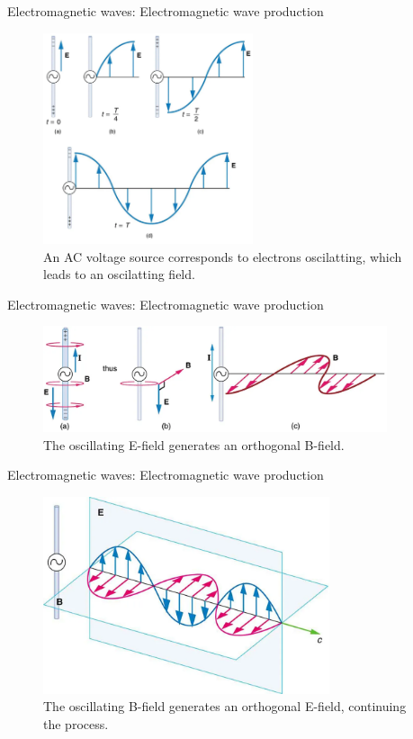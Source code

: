 \documentclass{beamer}
\begin{document}
\begin{frame}{Electromagnetic waves: Electromagnetic wave production}
\begin{figure}
\centering
\includegraphics[width=0.55\textwidth]{figures/gen1.png}
\caption{\label{fig:gen1} An AC voltage source corresponds to electrons oscilatting, which leads to an oscilatting field.}
\end{figure}
\end{frame}

\begin{frame}{Electromagnetic waves: Electromagnetic wave production}
\begin{figure}
\centering
\includegraphics[width=0.9\textwidth]{figures/gen2.png}
\caption{\label{fig:gen2} The oscillating E-field generates an orthogonal B-field.}
\end{figure}
\end{frame}

\begin{frame}{Electromagnetic waves: Electromagnetic wave production}
\begin{figure}
\centering
\includegraphics[width=0.75\textwidth]{figures/gen3.png}
\caption{\label{fig:gen3} The oscillating B-field generates an orthogonal E-field, continuing the process.}
\end{figure}
\end{frame}
\end{document}
